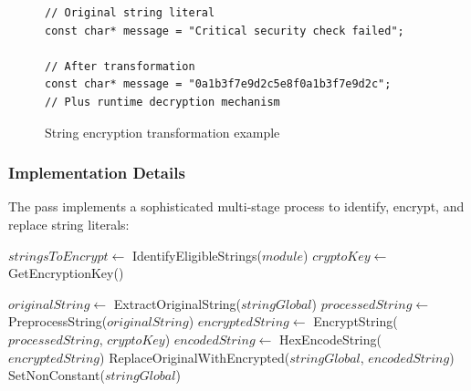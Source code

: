 \documentclass[conference]{IEEEtran}
\begin{document}
\begin{figure}[ht!]
\centering
\begin{minipage}{0.5\textwidth}
\begin{lstlisting}[style=pseudocode,basicstyle=\footnotesize]
// Original string literal
const char* message = "Critical security check failed";

// After transformation
const char* message = "0a1b3f7e9d2c5e8f0a1b3f7e9d2c";
// Plus runtime decryption mechanism
\end{lstlisting}
\end{minipage}
\caption{String encryption transformation example}
\end{figure}

\subsubsection{Implementation Details}
The pass implements a sophisticated multi-stage process to identify, encrypt, and replace string literals:

\begin{algorithm}[H]
\caption{Enhanced String Encryption Implementation}
\begin{algorithmic}[1]
    \State $stringsToEncrypt \gets$ IdentifyEligibleStrings($module$)
    \State $cryptoKey \gets$ GetEncryptionKey()
    
        \State $originalString \gets$ ExtractOriginalString($stringGlobal$)
        \State $processedString \gets$ PreprocessString($originalString$)
        \State $encryptedString \gets$ EncryptString($processedString$, $cryptoKey$)
        \State $encodedString \gets$ HexEncodeString($encryptedString$)
        \State ReplaceOriginalWithEncrypted($stringGlobal$, $encodedString$)
        \State SetNonConstant($stringGlobal$) 
    \EndFor
    
    \State \Return
\EndProcedure
\end{algorithmic}
\end{algorithm}
\end{document}
